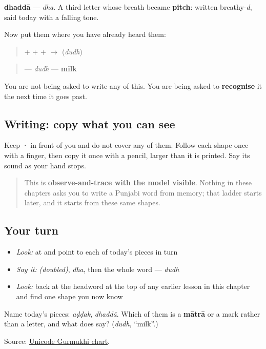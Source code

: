 \textbf{dhaddā} — \emph{dha}. A third letter whose breath became \textbf{pitch}: written breathy-\emph{d}, said today with a falling tone.

Now put them where you have already heard them:

\begin{quote}
\textbf{} + \textbf{} + \textbf{} + \textbf{} $\to$ \textbf{} (\emph{dudh})
\end{quote}

\begin{quote}
\textbf{} — \emph{dudh} — \textbf{milk}
\end{quote}

You are not being asked to write any of this. You are being asked to \textbf{recognise} it the next time it goes past.

\subsection*{Writing: copy what you can see}
Keep  ·  in front of you and do not cover any of them. Follow each shape once with a finger, then copy it once with a pencil, larger than it is printed. Say its sound as your hand stops.

\begin{quote}
This is \textbf{observe-and-trace with the model visible}. Nothing in these chapters asks you to write a Punjabi word from memory; that ladder starts later, and it starts from these same shapes.
\end{quote}

\subsection*{Your turn}
\begin{itemize}
\raggedright
  \item \emph{Look:} at \textbf{} and point to each of today's pieces in turn
  \item \emph{Say it:} \emph{(doubled)}, \emph{dha}, then the whole word — \emph{dudh}
  \item \emph{Look:} back at the headword at the top of any earlier lesson in this chapter and find one shape you now know
\end{itemize}

\begin{tcolorbox}[breakable,colback=teal!4,colframe=teal!35!black,title={Before you move on}]
Name today's pieces: \emph{aḍḍak}, \emph{dhaddā}. Which of them is a \textbf{mātrā} or a mark rather than a letter, and what does \textbf{} say? (\emph{dudh}, “milk”.)

Source: \href{https://www.unicode.org/charts/PDF/U0A00.pdf}{Unicode Gurmukhi chart}.
\end{tcolorbox}
